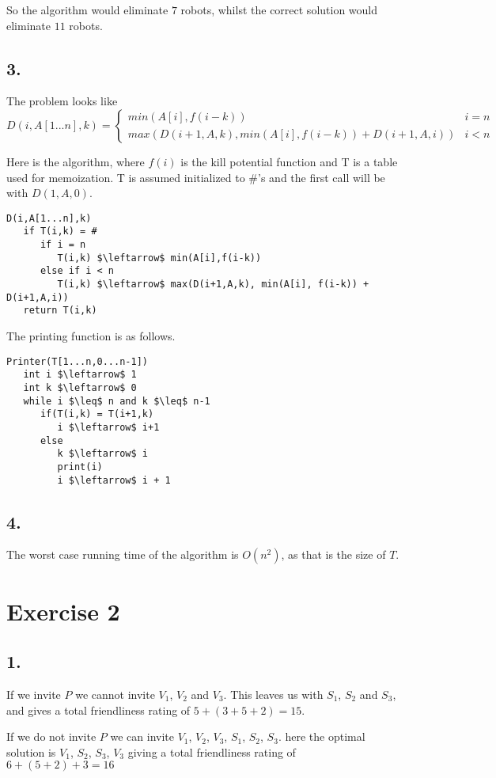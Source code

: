 \documentclass[12pt,a4paper]{report}
\begin{document}
So the algorithm would eliminate $7$ robots, whilst the correct solution would eliminate $11$ robots.

\subsection*{3.}
The problem looks like
$$D(i,A[1...n],k) =  \begin{cases}
min(A[i],f(i-k))   & i = n \\
max(D(i+1,A,k), min(A[i],f(i-k)) + D(i+1,A,i)) & i < n
\end{cases}$$

Here is the algorithm, where $f(i)$ is the kill potential function and T is a table used for memoization. T is assumed initialized to \#'s and the first call will be with $D(1,A,0)$.
\begin{lstlisting}
D(i,A[1...n],k)
   if T(i,k) = # 
      if i = n
         T(i,k) $\leftarrow$ min(A[i],f(i-k))
      else if i < n
         T(i,k) $\leftarrow$ max(D(i+1,A,k), min(A[i], f(i-k)) + D(i+1,A,i))
   return T(i,k)
\end{lstlisting}

The printing function is as follows.
\begin{lstlisting}
Printer(T[1...n,0...n-1])
   int i $\leftarrow$ 1
   int k $\leftarrow$ 0
   while i $\leq$ n and k $\leq$ n-1
      if(T(i,k) = T(i+1,k)
         i $\leftarrow$ i+1
      else
         k $\leftarrow$ i
         print(i)
         i $\leftarrow$ i + 1
\end{lstlisting}

\subsection*{4.}
The worst case running time of the algorithm is $O(n^2)$, as that is the size of $T$.

\section*{Exercise 2}
\subsection*{1.}
If we invite $P$ we cannot invite $V_1$, $V_2$ and $V_3$. This leaves us with $S_1$, $S_2$ and $S_3$, and gives a total friendliness rating of $5 + (3 + 5 + 2) = 15$.

If we do not invite $P$ we can invite $V_1$, $V_2$, $V_3$, $S_1$, $S_2$, $S_3$.
here the optimal solution is $V_1$, $S_2$, $S_3$, $V_3$ giving a total friendliness rating of $6 + (5 + 2) + 3 = 16$
\end{document}

